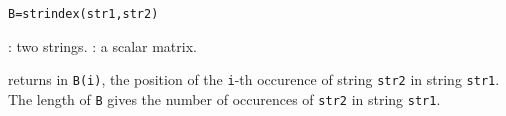 
\begin{mandesc}
\end{mandesc}
\begin{calling_sequence}
\begin{verbatim}
B=strindex(str1,str2)
\end{verbatim}
\end{calling_sequence}

\begin{parameters}
  \begin{varlist}
    : two strings.
    : a scalar matrix. 
  \end{varlist}
\end{parameters}

\begin{mandescription}
returns in \verb+B(i)+, the position of the \verb+i+-th occurence 
of string \verb+str2+ in string \verb+str1+. The length of \verb+B+ 
gives the number of occurences of \verb+str2+ in string \verb+str1+.
\end{mandescription}


